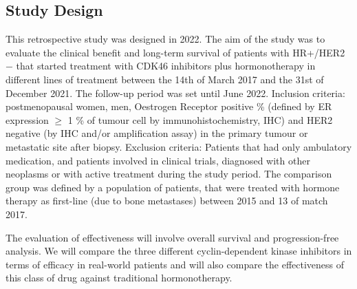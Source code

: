 

\subsection{Study Design}


This retrospective study was designed in 2022. The aim of the study was to evaluate the clinical benefit and long-term survival of patients with HR+/HER2$-$ that started treatment with CDK4\/6 inhibitors plus hormonotherapy in different lines of treatment between the 14th of March 2017 and the 31st of December 2021. The follow-up period was set until June 2022. 
Inclusion criteria:  postmenopausal women, men, Oestrogen Receptor positive \% (defined by ER expression $\geq$ 1 \% of tumour cell by immunohistochemistry, IHC)
and HER2 negative (by IHC and/or amplification assay) in the primary tumour or metastatic site after biopsy.
Exclusion criteria: Patients that had only ambulatory medication, and patients involved in clinical trials, diagnosed with other neoplasms or with active treatment during the study period.
The comparison group was defined by a population of patients, that were treated with hormone therapy as first-line (due to bone metastases) between 2015 and 13 of match 2017.

The evaluation of effectiveness will involve overall survival and progression-free analysis. We will compare the three different cyclin-dependent kinase inhibitors in terms of efficacy in real-world patients and will also compare the effectiveness of this class of drug against traditional hormonotherapy. 



